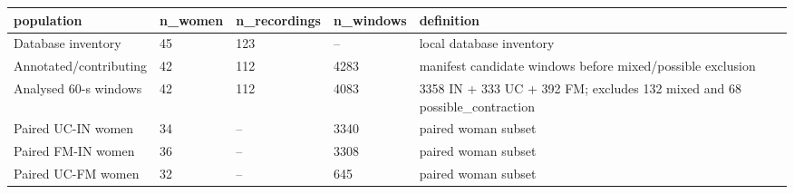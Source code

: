 \begin{tabular}{lllll}
\toprule
population & n\_women & n\_recordings & n\_windows & definition \\
\midrule
Database inventory & 45 & 123 & -- & local database inventory \\
Annotated/contributing & 42 & 112 & 4283 & manifest candidate windows before mixed/possible exclusion \\
Analysed 60-s windows & 42 & 112 & 4083 & 3358 IN + 333 UC + 392 FM; excludes 132 mixed and 68 possible\_contraction \\
Paired UC-IN women & 34 & -- & 3340 & paired woman subset \\
Paired FM-IN women & 36 & -- & 3308 & paired woman subset \\
Paired UC-FM women & 32 & -- & 645 & paired woman subset \\
\bottomrule
\end{tabular}
